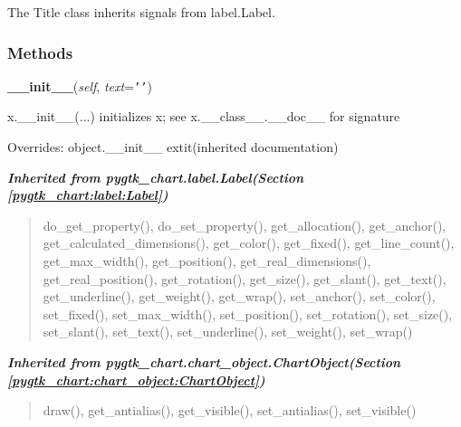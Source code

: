   The Title class inherits signals from label.Label.



  \subsubsection{Methods}

    \vspace{0.5ex}

\hspace{.8\funcindent}\begin{boxedminipage}{\funcwidth}

    \raggedright \textbf{\_\_init\_\_}(\textit{self}, \textit{text}={\tt \texttt{'}\texttt{}\texttt{'}})

\setlength{\parskip}{2ex}
    x.\_\_init\_\_(...) initializes x; see x.\_\_class\_\_.\_\_doc\_\_ for 
    signature

\setlength{\parskip}{1ex}
      Overrides: object.\_\_init\_\_ 	extit{(inherited documentation)}

    \end{boxedminipage}


\large{\textbf{\textit{Inherited from pygtk\_chart.label.Label\textit{(Section \ref{pygtk_chart:label:Label})}}}}

\begin{quote}
do\_get\_property(), do\_set\_property(), get\_allocation(), get\_anchor(), get\_calculated\_dimensions(), get\_color(), get\_fixed(), get\_line\_count(), get\_max\_width(), get\_position(), get\_real\_dimensions(), get\_real\_position(), get\_rotation(), get\_size(), get\_slant(), get\_text(), get\_underline(), get\_weight(), get\_wrap(), set\_anchor(), set\_color(), set\_fixed(), set\_max\_width(), set\_position(), set\_rotation(), set\_size(), set\_slant(), set\_text(), set\_underline(), set\_weight(), set\_wrap()
\end{quote}

\large{\textbf{\textit{Inherited from pygtk\_chart.chart\_object.ChartObject\textit{(Section \ref{pygtk_chart:chart_object:ChartObject})}}}}

\begin{quote}
draw(), get\_antialias(), get\_visible(), set\_antialias(), set\_visible()
\end{quote}

